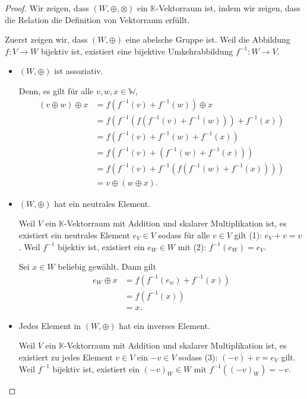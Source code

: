\documentclass[12pt]{extarticle}
\newcommand{\ib}[1]{\boldsymbol{\mathit{#1}}}
\newcommand{\mg}[1]{\mathbb{#1}}
\begin{document}
\begin{proof}
  Wir zeigen, dass \((W, \oplus, \otimes)\) ein \(\mg{K}\)-Vektorraum
  ist, indem wir zeigen, dass die Relation die Definition von
  Vektorraum erfüllt.

  Zuerst zeigen wir, dass \((W, \oplus)\) eine abelsche Gruppe ist.
  Weil die Abbildung \(f \colon V \to W\) bijektiv ist, existiert eine
  bijektive Umkehrabbildung \(f^{-1}\colon W \rightarrow V\).
  \begin{itemize}
  \item \((W, \oplus)\) ist assoziativ.

    Denn, es gilt für alle \(\ib{v}, \ib{w}, \ib{x} \in \mg{W}\),
\begin{align*}
  (\ib{v} \oplus \ib{w}) \oplus \ib{x}
  &= f(f^{-1}(\ib{v}) + f^{-1}(\ib{w})) \oplus \ib{x}\\
  &= f(f^{-1}(f(f^{-1}(\ib{v}) + f^{-1}(\ib{w}))) +
    f^{-1}(\ib{x}))\\
  &= f(f^{-1}(\ib{v}) + f^{-1}(\ib{w}) + f^{-1}(\ib{x}))
    \tag*{\(f\) bijektiv}\\
  &= f(f^{-1}(\ib{v}) + (f^{-1}(\ib{w}) + f^{-1}(\ib{x})))
    \tag*{\((V, \oplus)\) abelsche Gruppe}\\
  &= f(f^{-1}(\ib{v}) + f^{-1}(f(f^{-1}(\ib{w}) + f^{-1}(\ib{x}))))\\
  &= \ib{v} \oplus (\ib{w} \oplus \ib{x}).
\end{align*}
\item \((W, \oplus)\) hat ein neutrales Element.

    Weil \(V\) ein \(\mg{K}\)-Vektorraum mit Addition und skalarer
    Multiplikation ist, es existiert ein neutrales Element \(\ib{e_V} \in V\)
    sodass für alle \(\ib{v} \in V\) gilt (1): \(\ib{e_V} + \ib{v} = \ib{v}\).
    Weil \(f^{-1}\) bijektiv ist, existiert ein \(\ib{e_W} \in W\) mit
    (2): \(f^{-1}(\ib{e_W})=\ib{e_V}\).

    Sei \(\ib{x} \in W\) beliebig gewählt.  Dann gilt
\begin{align*}
  \ib{e_W} \oplus \ib{x} &= f(f^{-1}{(\ib{e_w})}+f^{-1}{(\ib{x})})\\
                         &= f(f^{-1}{(\ib{x})}) \tag*{Wegen (1)}\\
                         &= \ib{x}.
\end{align*}
\item Jedes Element in \((W, \oplus)\) hat ein inverses Element.

  Weil \(V\) ein \(\mg{K}\)-Vektorraum mit Addition und skalarer
  Multiplikation ist, es existiert zu jedes Element \(\ib{v} \in V\) ein
  \(\ib{-v} \in V\) sodass (3): \((\ib{-v}) + \ib{v} = \ib{e_V}\) gilt.
  Weil \(f^{-1}\) bijektiv ist, existiert ein \((\ib{-v})_W \in W\) mit
  \(f^{-1}((\ib{-v})_W)=\ib{-v}\).


\end{itemize}
\end{proof}
\end{document}
